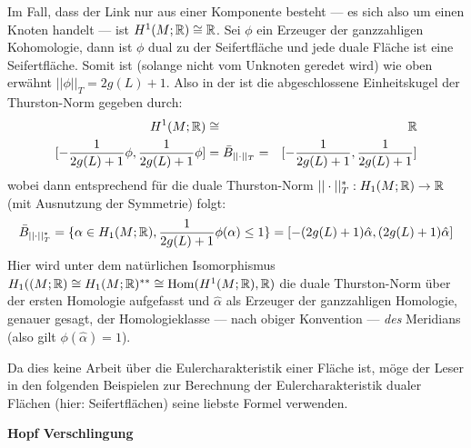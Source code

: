         Im Fall, dass der Link nur aus einer Komponente besteht --- es sich also um einen Knoten handelt --- ist $H^1(M;\mathbb{R})\cong \mathbb{R}$. Sei $\phi$ ein Erzeuger der ganzzahligen Kohomologie, dann ist $\phi$ dual zu der Seifertfläche und jede duale Fläche ist eine Seifertfläche. Somit ist (solange nicht vom Unknoten geredet wird) wie oben erwähnt $||\phi||_T=2g(L)+1$. Also in der ist die abgeschlossene Einheitskugel der Thurston-Norm gegeben durch:
        \begin{eqnarray*}
            H^1(M;\mathbb{R}) &\cong & \mathbb{R} \\
            {[- \frac{1}{2g(L)+1} \phi,\frac 1 {2g(L)+1} \phi]} & = \bar B_{||\cdot||_T}=& {[- \frac 1 {2g(L)+1}, \frac 1 {2g(L)+1}]}
        \end{eqnarray*}
        wobei dann entsprechend für die duale Thurston-Norm $||\cdot||_T^* : H_1(M;\mathbb{R})\to \mathbb{R}$ (mit Ausnutzung der Symmetrie) folgt:
        \[
            \bar B_{||\cdot||_T^*} = \{\alpha \in H_1(M;\mathbb{R}), \frac{1}{2g(L)+1}\phi (\alpha)\leq 1\} = {[-(2g(L)+1)\hat \alpha, (2g(L)+1) \hat \alpha]}
        \]
        Hier wird unter dem natürlichen Isomorphismus $H_1((M;\mathbb{R}) \cong H_1(M;\mathbb{R})^{**} \cong \operatorname{Hom}(H^1(M;\mathbb{R}),\mathbb{R})$ die duale Thurston-Norm über der ersten Homologie aufgefasst und $\hat \alpha$ als Erzeuger der ganzzahligen Homologie, genauer gesagt, der Homologieklasse --- nach obiger Konvention --- \emph{des} Meridians (also gilt $\phi(\hat \alpha)=1$). 
        \begin{bem}
            Da dies keine Arbeit über die Eulercharakteristik einer Fläche ist, möge der Leser in den folgenden Beispielen zur Berechnung der Eulercharakteristik dualer Flächen (hier: Seifertflächen) seine liebste Formel verwenden.
        \end{bem}
        \textbf{Hopf Verschlingung}

